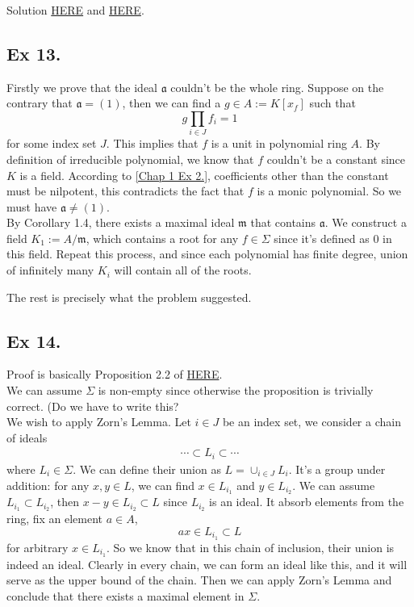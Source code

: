 Solution \href{https://math.stackexchange.com/questions/3180861/proof-check-idempotents-of-a-local-commutative-ring}{HERE} and \href{https://math.stackexchange.com/questions/725171/idempotents-in-a-local-ring}{HERE}.



\subsection{Ex 13.}

\indent Firstly we prove that the ideal $\mathfrak a$ couldn't be the whole ring. Suppose on the contrary that $\mathfrak a=(1)$, then we can find a $g\in A:=K[x_f]$ such that 
$$g\prod_{i\in J}f_i=1$$ for some index set $J$. This implies that $f$ is a unit in polynomial ring $A$. By definition of irreducible polynomial, we know that $f$ couldn't be a constant since $K$ is a field. According to \ref{Chap 1 Ex 2.}, coefficients other than the constant must be nilpotent, this contradicts the fact that $f$ is a monic polynomial. So we must have $\mathfrak a\neq (1)$.\\

By Corollary 1.4, there exists a maximal ideal $\mathfrak m$ that contains $\mathfrak a$. We construct a field $K_1:=A/\mathfrak m$, which contains a root for any $f\in \Sigma$ since it's defined as $0$ in this field. Repeat this process, and since each polynomial has finite degree, union of infinitely many $K_i$ will contain all of the roots. 

The rest is precisely what the problem suggested.



\subsection{Ex 14.}

Proof is basically Proposition 2.2 of \href{https://www.jmilne.org/math/xnotes/CA.pdf}{HERE}.\\

We can assume $\Sigma$ is non-empty since otherwise the proposition is trivially correct.  (Do we have to write this?\\

We wish to apply Zorn's Lemma. Let $i\in J$ be an index set, we consider a chain of ideals
\begin{align*}
    \cdots\subset L_i\subset \cdots
\end{align*}where $L_i\in \Sigma$. We can define their union as $L=\cup_{i\in J} L_i$. 
It's a group under addition: for any $x,y\in L$, we can find $x\in L_{i_1}$ and $y\in L_{i_2}$. We can assume $L_{i_1}\subset L_{i_2}$, then $x-y\in L_{i_2}\subset L$ since $L_{i_2}$ is an ideal. It absorb elements from the ring, fix an element $a\in A$, 
$$ax\in L_{i_1}\subset L$$ for arbitrary $x\in L_{i_1}$. So we know that in this chain of inclusion, their union is indeed an ideal. Clearly in every chain, we can form an ideal like this, and it will serve as the upper bound of the chain. Then we can apply Zorn's Lemma and conclude that there exists a maximal element in $\Sigma$.\\

